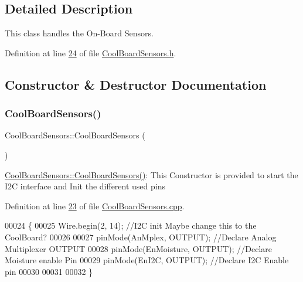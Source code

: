 \subsection{Detailed Description}
This class handles the On-\/\+Board Sensors. 

Definition at line \hyperlink{_cool_board_sensors_8h_source_l00024}{24} of file \hyperlink{_cool_board_sensors_8h_source}{Cool\+Board\+Sensors.\+h}.



\subsection{Constructor \& Destructor Documentation}
\mbox{\label{class_cool_board_sensors_a91ff2a02f5486f90cf2413a1cf8a9ed4}} 
\subsubsection{\texorpdfstring{Cool\+Board\+Sensors()}{CoolBoardSensors()}}
{\footnotesize\ttfamily Cool\+Board\+Sensors\+::\+Cool\+Board\+Sensors (\begin{DoxyParamCaption}{ }\end{DoxyParamCaption})}

\hyperlink{class_cool_board_sensors_a91ff2a02f5486f90cf2413a1cf8a9ed4}{Cool\+Board\+Sensors\+::\+Cool\+Board\+Sensors()}\+: This Constructor is provided to start the I2C interface and Init the different used pins 

Definition at line \hyperlink{_cool_board_sensors_8cpp_source_l00023}{23} of file \hyperlink{_cool_board_sensors_8cpp_source}{Cool\+Board\+Sensors.\+cpp}.


\begin{DoxyCode}
00024 \{
00025     Wire.begin(2, 14);                       \textcolor{comment}{//I2C init Maybe change this to the CoolBoard?}
00026 
00027     pinMode(AnMplex, OUTPUT);                \textcolor{comment}{//Declare Analog Multiplexer OUTPUT}
00028     pinMode(EnMoisture, OUTPUT);             \textcolor{comment}{//Declare Moisture enable Pin}
00029     pinMode(EnI2C, OUTPUT);        \textcolor{comment}{//Declare I2C Enable pin }
00030 
00031 
00032 \}
\end{DoxyCode}


